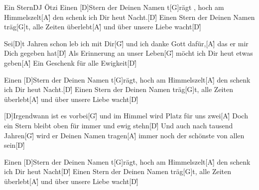 \documentclass[../main.tex]{subfiles}
\begin{document}
\begin{song}{Ein Stern}{DJ Ötzi}{}
Einen [D]Stern der Deinen Namen t[G]rägt ,
hoch am Himmelszelt[A]{\h}
den schenk ich Dir heut Nacht.[D]{\h}
Einen Stern der Deinen Namen träg[G]t,
alle Zeiten überlebt[A]{\h}
und über unsere Liebe wacht[D]{\h}

Sei[D]t Jahren schon leb ich mit Dir[G]{\h}
und ich danke Gott dafür,[A]{\h}
das er mir Dich gegeben hat[D]{\h}
Als Erinnerung an unser Leben[G]{\h}
möcht ich Dir heut etwas geben[A]{\h}
Ein Geschenk für alle Ewigkeit[D]{\h}

Einen [D]Stern der Deinen Namen t[G]rägt,
hoch am Himmelszelt[A]{\h}
den schenk ich Dir heut Nacht.[D]{\h}
Einen Stern der Deinen Namen träg[G]t,
alle Zeiten überlebt[A]{\h}
und über unsere Liebe wacht[D]{\h}

[D]Irgendwann ist es vorbei[G]{\h}
und im Himmel wird Platz für uns zwei[A]{\h}
Doch ein Stern bleibt oben für immer und ewig stehn[D]{\h}
Und auch nach tausend Jahren[G]{\h}
wird er Deinen Namen tragen[A]{\h}
immer noch der schönste von allen sein[D]{\h}

Einen [D]Stern der Deinen Namen t[G]rägt,
hoch am Himmelszelt[A]{\h}
den schenk ich Dir heut Nacht[D]{\h}
Einen Stern der Deinen Namen träg[G]t,
alle Zeiten überlebt[A]{\h}
und über unsere Liebe wacht[D]{\h}
\end{song}
\end{document}
